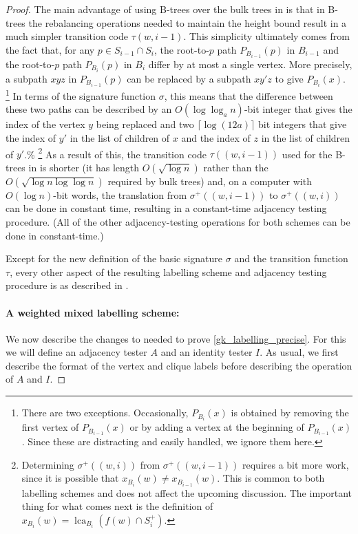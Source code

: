 \documentclass[twoside,leqno]{article}
\DeclareMathOperator{\lca}{lca}
\newcommand{\Oh}{O}
\begin{document}
\begin{proof}
  The main advantage of using B-trees over the bulk trees in \cite{dujmovic.esperet.ea:adjacency} is that in B-trees the rebalancing operations needed to maintain the height bound result in a much simpler transition code $\tau(w,i-1)$.
  This simplicity ultimately comes from the fact that, for any $p\in S_{i-1}\cap S_i$, the root-to-$p$ path $P_{B_{i-1}}(p)$ in $B_{i-1}$ and the root-to-$p$ path $P_{B_i}(p)$ in $B_i$ differ by at most a single vertex.
  More precisely, a subpath $xyz$ in $P_{B_{i-1}}(p)$ can be replaced by a subpath $xy'z$ to give $P_{B_i}(x)$.%
  \footnote{There are two exceptions. Occasionally, $P_{B_i}(x)$ is obtained by removing the first vertex of $P_{B_{i-1}}(x)$ or by adding a vertex at the beginning of $P_{B_{i-1}}(x)$. Since these are distracting and easily handled, we ignore them here.}
  In terms of the signature function $\sigma$, this means that the difference between these two paths can be described by an $\Oh(\log\log_a n)$-bit integer that gives the index of the vertex $y$ being replaced and two $\lceil\log (12a)\rceil$ bit integers that give the index of $y'$ in the list of children of $x$ and the index of $z$ in the list of children of $y'$.\%
  \footnote{Determining $\sigma^+((w,i))$ from $\sigma^+((w,i-1))$ requires a bit more work, since it is possible that $x_{B_i}(w)\neq x_{B_{i-1}}(w)$. This is common to both labelling schemes and does not affect the upcoming discussion. The important thing for what comes next is the definition of $x_{B_i}(w)=\lca_{B_i}(f(w)\cap S^+_i)$.}
    As a result of this, the transition code $\tau((w,i-1))$ used for the B-trees in \cite{gawrychowski.janczewski:simpler} is shorter (it has length $\Oh(\sqrt{\log n})$ rather than the $\Oh(\sqrt{\log n\log\log n})$ required by bulk trees) and, on a computer with $\Oh(\log n)$-bit words, the translation from $\sigma^+((w,i-1))$ to $\sigma^+((w,i))$ can be done in constant time, resulting in a constant-time adjacency testing procedure. (All of the other adjacency-testing operations for both schemes can be done in constant-time.)

    Except for the new definition of the basic signature $\sigma$ and the transition function $\tau$, every other aspect of the resulting labelling scheme and adjacency testing procedure is as described in \cite{dujmovic.esperet.ea:adjacency}.

    \paragraph{A weighted mixed labelling scheme:}
    We now describe the changes to \cite{gawrychowski.janczewski:simpler,dujmovic.esperet.ea:adjacency} needed to prove \cref{gk_labelling_precise}.  For this we will define an adjacency tester $A$ and an identity tester $I$. As usual, we first describe the format of the vertex and clique labels before describing the operation of $A$ and $I$.


\end{proof}
\end{document}
